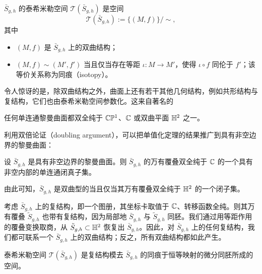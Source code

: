 \begin{definition}[6.2] $\bar S_{g,h}$ 的泰希米勒空间 $\mathcal{T}(\bar S_{g,h})$ 是空间
\[
\mathcal{T}(\bar S_{g,h}):=\{(M,f)\}/\sim,
\]
其中
\begin{itemize}
  \item $(M,f)$ 是 $\bar S_{g,h}$ 上的双曲结构；
  \item $(M,f)\sim(M',f')$ 当且仅当存在等距 $\iota:M\to M'$，使得 $\iota\circ f$ 同伦于 $f'$；该等价关系称为同痕（isotopy）。
\end{itemize}
\end{definition}

令人惊讶的是，除双曲结构之外，曲面上还有若干其他几何结构，例如共形结构与复结构，它们也由泰希米勒空间参数化。这来自著名的

\begin{theorem}[6.3（庞加莱单值化）] 任何单连通黎曼曲面都双全纯于 $\mathbb{C}\mathbb{P}^1$、$\mathbb{C}$ 或双曲平面 $\mathbb{H}^2$ 之一。\end{theorem}

利用双倍论证（doubling argument），可以把单值化定理的结果推广到具有非空边界的黎曼曲面：

\begin{theorem}[6.4] 设 $\bar S_{g,h}$ 是具有非空边界的黎曼曲面。则 $\bar S_{g,h}$ 的万有覆叠双全纯于 $\mathbb{C}$ 的一个具有非空内部的单连通闭真子集。\end{theorem}

由此可知，$\bar S_{g,h}$ 是双曲型的当且仅当其万有覆叠双全纯于 $\mathbb{H}^2$ 的一个闭子集。


考虑 $\bar S_{g,h}$ 上的复结构，即一个图册，其坐标卡取值于 $\mathbb{C}$、转移函数全纯。则其万有覆叠 $\tilde S_{g,h}$ 也带有复结构，因为局部地 $\bar S_{g,h}$ 与 $\tilde S_{g,h}$ 同胚。我们通过用等距作用的覆叠变换取商，从 $\tilde S_{g,h}\subset\mathbb{H}^2$ 恢复出 $\bar S_{g,h}$。因此，对 $\bar S_{g,h}$ 上的任何复结构，我们都可联系一个 $\bar S_{g,h}$ 上的双曲结构；反之，所有双曲结构都如此产生。

\begin{theorem}[6.5] 泰希米勒空间 $\mathcal{T}(\bar S_{g,h})$ 是复结构模去 $\bar S_{g,h}$ 的同痕于恒等映射的微分同胚所成的空间。\end{theorem}

